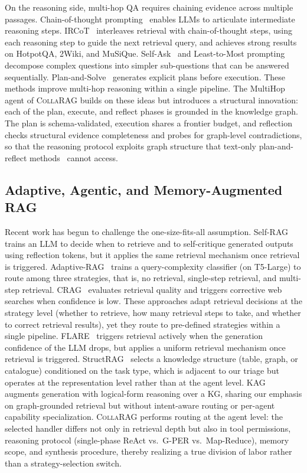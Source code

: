 \documentclass[11pt,a4paper]{article}
\newcommand{\sys}{\textsc{CollaRAG}}
\begin{document}
On the reasoning side, multi-hop QA requires chaining evidence across multiple passages.
Chain-of-thought prompting~\citep{wei2022chain} enables LLMs to articulate intermediate reasoning steps.
IRCoT~\citep{trivedi2023ircot} interleaves retrieval with chain-of-thought steps, using each reasoning step to guide the next retrieval query, and achieves strong results on HotpotQA, 2Wiki, and MuSiQue.
Self-Ask~\citep{press2023measuring} and Least-to-Most prompting~\citep{zhou2023leasttomost} decompose complex questions into simpler sub-questions that can be answered sequentially.
Plan-and-Solve~\citep{wang2023plan} generates explicit plans before execution.
These methods improve multi-hop reasoning within a single pipeline.
The MultiHop agent of \sys{} builds on these ideas but introduces a structural innovation: each of the plan, execute, and reflect phases is grounded in the knowledge graph.
The plan is schema-validated, execution shares a frontier budget, and reflection checks structural evidence completeness and probes for graph-level contradictions, so that the reasoning protocol exploits graph structure that text-only plan-and-reflect methods~\citep{wang2023plan,shinn2023reflexion} cannot access.

\subsection{Adaptive, Agentic, and Memory-Augmented RAG}

Recent work has begun to challenge the one-size-fits-all assumption.
Self-RAG~\citep{asai2024selfrag} trains an LLM to decide when to retrieve and to self-critique generated outputs using reflection tokens, but it applies the same retrieval mechanism once retrieval is triggered.
Adaptive-RAG~\citep{jeong2024adaptive} trains a query-complexity classifier (on T5-Large) to route among three strategies, that is, no retrieval, single-step retrieval, and multi-step retrieval.
CRAG~\citep{yan2024crag} evaluates retrieval quality and triggers corrective web searches when confidence is low.
These approaches adapt retrieval decisions at the strategy level (whether to retrieve, how many retrieval steps to take, and whether to correct retrieval results), yet they route to pre-defined strategies within a single pipeline.
FLARE~\citep{jiang2023flare} triggers retrieval actively when the generation confidence of the LLM drops, but applies a uniform retrieval mechanism once retrieval is triggered.
StructRAG~\citep{li2024structrag} selects a knowledge structure (table, graph, or catalogue) conditioned on the task type, which is adjacent to our triage but operates at the representation level rather than at the agent level.
KAG~\citep{liang2024kag} augments generation with logical-form reasoning over a KG, sharing our emphasis on graph-grounded retrieval but without intent-aware routing or per-agent capability specialization.
\sys{} performs routing at the agent level: the selected handler differs not only in retrieval depth but also in tool permissions, reasoning protocol (single-phase ReAct vs.\ G-PER vs.\ Map-Reduce), memory scope, and synthesis procedure, thereby realizing a true division of labor rather than a strategy-selection switch.
\end{document}
